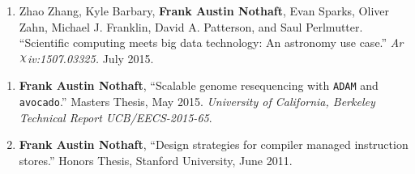 \documentclass[10pt]{article} %
\begin{document}
\begin {minipage}[t]{0.8\linewidth}

\begin{enumerate}[resume]
\item {Zhao Zhang, Kyle Barbary, \textbf{Frank Austin Nothaft}, Evan Sparks, Oliver Zahn,
Michael J. Franklin, David A. Patterson, and Saul Perlmutter. ``Scientific computing meets big data
technology: An astronomy use case.'' \emph{Ar$\raisebox{2pt}{$\chi$}$iv:1507.03325.} July 2015.}
\end{enumerate}


\begin{enumerate}[resume]
\item {\textbf{Frank Austin Nothaft}, ``Scalable genome resequencing with \texttt{ADAM} and \texttt{avocado}.''
Masters Thesis, May 2015. \emph{University of California, Berkeley Technical Report UCB/EECS-2015-65}.} 
\item {\textbf{Frank Austin Nothaft}, ``Design strategies for compiler managed instruction stores.''
Honors Thesis, Stanford University, June 2011.}
\end{enumerate}

\end {minipage}

\begin {minipage}[t]{0.2\linewidth}
\vspace{0pt}
\end {minipage}
\begin {minipage}[t]{0.8\linewidth}
\vspace{0pt}
 \\
 \\

 \\
 \\

 \\
 \\
\end {minipage}
\end{document}

